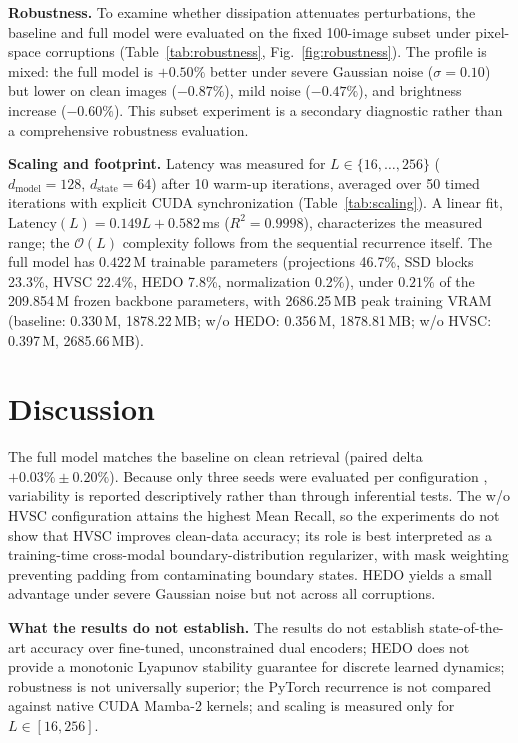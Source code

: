\documentclass[pdflatex,sn-mathphys-num]{sn-jnl}
\begin{document}
\textbf{Robustness.} To examine whether dissipation attenuates perturbations, the baseline and full model were evaluated on the fixed 100-image subset under pixel-space corruptions (Table~\ref{tab:robustness}, Fig.~\ref{fig:robustness}). The profile is mixed: the full model is $+0.50\%$ better under severe Gaussian noise ($\sigma=0.10$) but lower on clean images ($-0.87\%$), mild noise ($-0.47\%$), and brightness increase ($-0.60\%$). This subset experiment is a secondary diagnostic rather than a comprehensive robustness evaluation.

\textbf{Scaling and footprint.} Latency was measured for $L \in \{16, \dots, 256\}$ ($d_{\text{model}}=128$, $d_{\text{state}}=64$) after 10 warm-up iterations, averaged over 50 timed iterations with explicit CUDA synchronization (Table~\ref{tab:scaling}). A linear fit, $\text{Latency}(L) = 0.149 L + 0.582$\,ms ($R^2 = 0.9998$), characterizes the measured range; the $\mathcal{O}(L)$ complexity follows from the sequential recurrence itself. The full model has $0.422$\,M trainable parameters (projections 46.7\%, SSD blocks 23.3\%, HVSC 22.4\%, HEDO 7.8\%, normalization 0.2\%), under $0.21\%$ of the 209.854\,M frozen backbone parameters, with 2686.25\,MB peak training VRAM (baseline: 0.330\,M, 1878.22\,MB; w/o HEDO: 0.356\,M, 1878.81\,MB; w/o HVSC: 0.397\,M, 2685.66\,MB).

\section{Discussion}
\label{sec:discussion}

The full model matches the baseline on clean retrieval (paired delta $+0.03\% \pm 0.20\%$). Because only three seeds were evaluated per configuration
, variability is reported descriptively rather than through inferential tests. The w/o HVSC configuration attains the highest Mean Recall, so the experiments do not show that HVSC improves clean-data accuracy; its role is best interpreted as a training-time cross-modal boundary-distribution regularizer, with mask weighting preventing padding from contaminating boundary states. HEDO yields a small advantage under severe Gaussian noise but not across all corruptions.

\textbf{What the results do not establish.} The results do not establish state-of-the-art accuracy over fine-tuned, unconstrained dual encoders; HEDO does not provide a monotonic Lyapunov stability guarantee for discrete learned dynamics; robustness is not universally superior; the PyTorch recurrence is not compared against native CUDA Mamba-2 kernels; and scaling is measured only for $L \in [16, 256]$.
\end{document}
